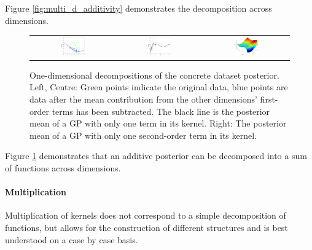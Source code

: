 \documentclass[twoside]{article}
\begin{document}
Figure \ref{fig:multi_d_additivity} demonstrates the decomposition across dimensions.
%
\begin{figure}[h]
\centering
\begin{tabular}{ccc}
\includegraphics[width=0.3\textwidth]{../figures/additive_multi_d/interpretable_1st_order1.pdf} &
\includegraphics[width=0.3\textwidth]{../figures/additive_multi_d/interpretable_1st_order2.pdf}& 
\includegraphics[width=0.3\textwidth]{../figures/additive_multi_d/interpretable_2nd_order1.pdf}\\
\end{tabular}
\caption{One-dimensional decompositions of the concrete dataset posterior.  Left, Centre:  Green points indicate the original data, blue points are data after the mean contribution from the other dimensions' first-order terms has been subtracted.  The black line is the posterior mean of a GP with only one term in its kernel.  Right:  The posterior mean of a GP with only one second-order term in its kernel.}
\label{fig:interpretable functions}
\end{figure}
%
Figure \ref{fig:interpretable functions} demonstrates that an additive posterior can be decomposed into a sum of functions across dimensions.


\paragraph{Multiplication}

Multiplication of kernels does not correspond to a simple decomposition of functions, but allows for the construction of different structures and is best understood on a case by case basis.
\end{document}

